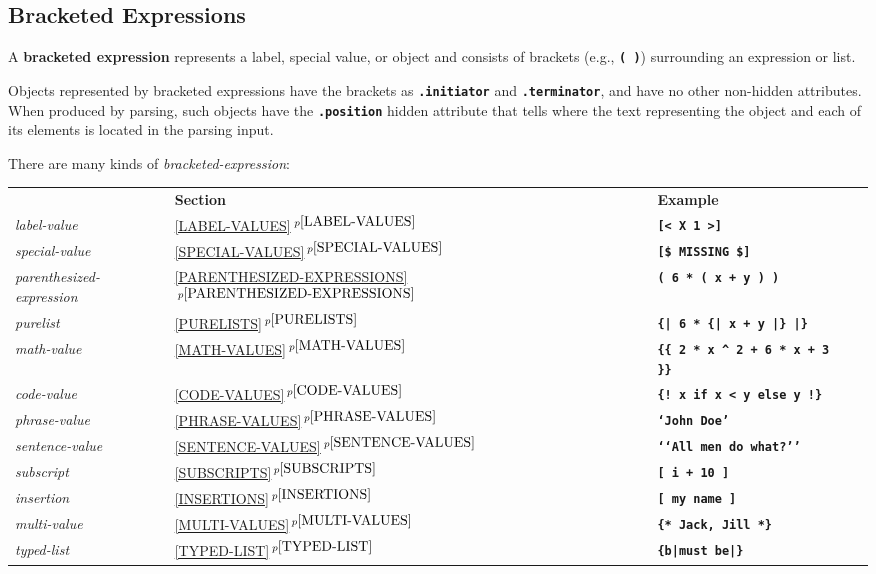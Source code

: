 \documentclass[12pt]{article}
\newcommand{\TT}[1]{{\tt \bfseries #1}}
\newcommand{\key}[1]{{\rm \bfseries #1}}
\newcommand{\itemref}[1]{\ref{#1}$\,^{p\pageref{#1}}$}
\newcommand{\CIRCUM}{\textasciicircum}
\begin{document}
\subsection{Bracketed Expressions}
\label{BRACKETED-EXPRESSIONS}

A \key{bracketed expression} represents a label, special value, or object and
consists of brackets (e.g., \TT{(~)}) surrounding an expression or list.

Objects represented by bracketed expressions have the brackets as
\TT{.initiator} and \TT{.termin\-a\-tor}, and have no other non-hidden
attributes.  When produced by parsing, such objects have the
\TT{.posi\-tion} hidden attribute that tells where the text representing
the object and each of its elements is located in the parsing input.

There are many kinds of {\em bracketed-expression}:
\begin{center}
    \begin{tabular}[t]{l@{~~~~~}lll}
          & \bf Section & \bf Example \\[1ex]
      {\em label-value}
    & \itemref{LABEL-VALUES}
    & \TT{[< X 1 >]}
    \\
      {\em special-value}
    & \itemref{SPECIAL-VALUES}
    & \TT{[\$ MISSING \$]}
    \\
      {\em parenthesized-expression}
    & \itemref{PARENTHESIZED-EXPRESSIONS}
    & \TT{( 6 * ( x + y ) )}
    \\
      {\em purelist}
    & \itemref{PURELISTS}
    & \TT{\{| 6 * \{| x + y |\} |\}}
    \\
      {\em math-value}
    & \itemref{MATH-VALUES}
    & \TT{\{\{ 2 * x \CIRCUM{} 2 + 6 * x + 3 \}\}} 
    \\
      {\em code-value}
    & \itemref{CODE-VALUES}
    & \TT{\{! x if x < y else y !\}} 
    \\
      {\em phrase-value}
    & \itemref{PHRASE-VALUES}
    & \TT{`John Doe'}
    \\
      {\em sentence-value}
    & \itemref{SENTENCE-VALUES}
    & \TT{`{}`All men do what?'{}'}
    \\
      {\em subscript}
    & \itemref{SUBSCRIPTS}
    & \TT{[ i + 10 ]}
    \\
      {\em insertion}
    & \itemref{INSERTIONS}
    & \TT{[ my name ]}
    \\
      {\em multi-value}
    & \itemref{MULTI-VALUES}
    & \TT{\{* Jack, Jill *\}}
    \\
      {\em typed-list}
    & \itemref{TYPED-LIST}
    & \TT{\{b|must be|\}}
    \\
    \end{tabular}
\end{center}
\end{document}
